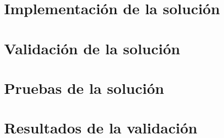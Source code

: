 \label{cap:validacion}

\section{Implementación de la solución}

\section{Validación de la solución}

\section{Pruebas de la solución}

\section{Resultados de la validación}

